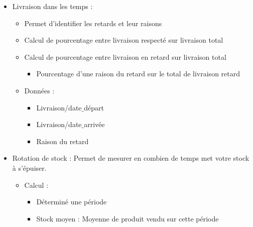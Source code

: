 \begin{itemize}

	\item Livraison dans les temps :  
	
		\begin{itemize}
		
			\item Permet d’identifier les retards et leur raisons 

			\item Calcul de pourcentage entre livraison respecté sur livraison total 

			\item Calcul de pourcentage entre livraison en retard sur livraison total 		
			
				\begin{itemize}
				
					\item Pourcentage d’une raison du retard sur le total de livraison retard 				
				
				\end{itemize}
				
			\item Données : 
			
				\begin{itemize}
					
					\item Livraison/date$\_$départ 

					\item Livraison/date$\_$arrivée 

					\item Raison du retard 					
					
				\end{itemize}					
		
		\end{itemize}
		
	\item Rotation de stock : Permet de mesurer en combien de temps met votre stock à s’épuiser. 
	
		\begin{itemize}
		
			\item  Calcul : 
			
				\begin{itemize}
				
					\item Déterminé une période 

					\item Stock moyen : Moyenne de produit vendu sur cette période 


\end{itemize}
\end{itemize}
\end{itemize}
